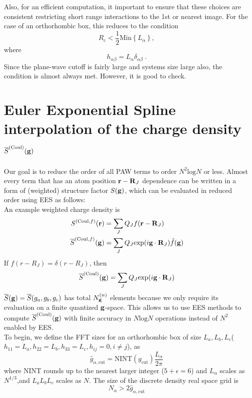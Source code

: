 \documentclass[paper=a4, fontsize=11pt]{article} %
\numberwithin{equation}{section} %
\numberwithin{figure}{section} %
\numberwithin{table}{section} %
\newcommand{\ol}{\overline}
\newcommand{\bg}{{\bf{g}}}
\newcommand{\br}{{\bf{r}}}
\newcommand{\bR}{{\bf{R}}}
\newcommand{\rexp}{{\mathrm{exp}}}
\newcommand{\rcut}{{\mathrm{cut}}}
\newcommand{\rCo}{{\mathrm{Coul}}}
\newcommand{\rl}{{\mathrm{log}}}
\newcommand{\ibgR}{i\bg\cdot\bR}
\newcommand{\al}{{\alpha}}
\newcommand{\Ngn}{{N^{(n)}_\bg}}
\newcommand{\Rc}{{R_{\mathrm{c}}}}
\begin{document}
Also, for an efficient computation, it important to ensure that these choices are consistent restricting short range interactions to the 1st or nearest image. For the case of an orthorhombic box, this reduces to the condition
\begin{equation}
\Rc < \frac{1}{2} \mathrm{Min}\left\{ L_\al \right\} ,
\end{equation}
where
\begin{equation}
h_{\al\beta} = L_\al \delta_{\al\beta}\ .
\end{equation}
Since the plane-wave cutoff is fairly large and systems size large also, the condition is almost always met. However, it is good to check.

\newpage
\section{Euler Exponential Spline interpolation of the charge density $\ol S^{(\rCo)}(\bg)$}

Our goal is to reduce the order of all PAW terms to order $N^2 \rl N$ or less. Almost every term that has an atom position $\br-\bR_J$ dependence can be written in a form of (weighted) structure factor $S(\bg)$, which can be evaluated in reduced order using EES as follows:\\

An example weighted charge density is
\begin{equation}
\begin{split}
S^{(\rCo,f)}(\br) &= \sum_J Q_J f(\br-\bR_J)\\
\ol{S}^{(\rCo,f)}(\bg) &= \sum_J Q_J \rexp(\ibgR_J) \tilde{f}(\bg)
\end{split}
\end{equation}
If $f(r-R_J) = \delta(r-R_J)$,  then
\begin{equation}
\ol{S}^{(\rCo)}(\bg) = \sum_J Q_J \rexp(\ibgR_J) 
\end{equation}
$\ol S(\bg) = \ol S(g_a,g_b,g_c)$ has total $\Ngn$ elements because we only require its evaluation on a finite quantized $\bg$-space. This allows us to use EES methods to compute $\ol{S}^{(\rCo)}(\bg)$ with finite accuracy in $N \rl N$ operations instead of $N^2$ enabled by EES.\\

To begin, we define the FFT sizes for an orthorhombic box of size $L_a,L_b,L_c$($h_{11}=L_a,h_{22}=L_b,h_{33}=L_c,h_{ij}=0,i \neq j$), as
\begin{equation}
\hat{g}_{\alpha,\rcut}=\mathrm{NINT}(g_\rcut)\frac{L_\al}{2\pi}
\end{equation}
where NINT rounds up to the nearest larger integer ($5+\epsilon=6$) and $L_\al$ scales as $N^{1/3}$,and $L_aL_bL_c$ scales as $N$. The size of the discrete density real space grid is
\begin{equation}
N_\alpha > 2\hat{g}_{\alpha,\rcut}
\end{equation}
\end{document}
